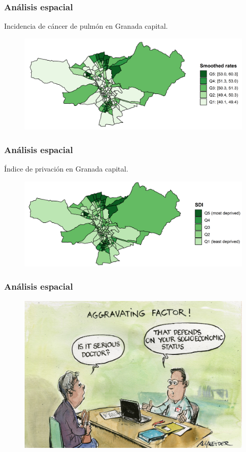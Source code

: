 \documentclass{beamer}
\begin{document}

\begin{frame}\frametitle{Análisis espacial}
	\centering Incidencia de cáncer de pulmón en Granada capital.
	\begin{figure}
		\centering
		\includegraphics[width=.9\textwidth]{images/03_lung_ebs_zoom.png}
	\end{figure}
\end{frame}


\begin{frame}\frametitle{Análisis espacial}
	\centering Índice de privación en Granada capital.
	\begin{figure}
		\centering
		\includegraphics[width=.9\textwidth]{images/maps_DI_zoom.png}
	\end{figure}
\end{frame}


\begin{frame}\frametitle{Análisis espacial}
	\begin{figure}
		\centering
		\includegraphics[width=.9\textwidth]{images/nivel_socioeconomico.jpeg}
	\end{figure}
	
\end{frame}
\end{document}
